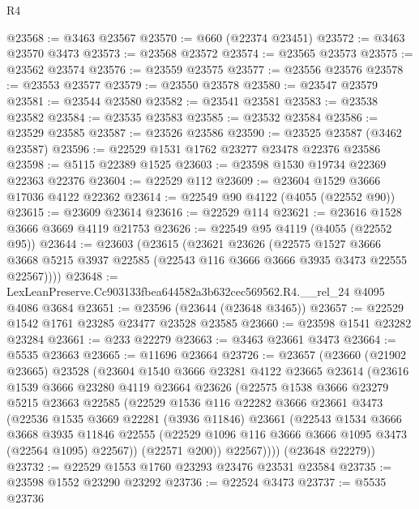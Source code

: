\begin{lexlean}{R4}
\begin{coremodule}
@23568 := @3463 @23567
@23570 := @660 (@22374 @23451)
@23572 := @3463 @23570 @3473
@23573 := @23568 @23572
@23574 := @23565 @23573
@23575 := @23562 @23574
@23576 := @23559 @23575
@23577 := @23556 @23576
@23578 := @23553 @23577
@23579 := @23550 @23578
@23580 := @23547 @23579
@23581 := @23544 @23580
@23582 := @23541 @23581
@23583 := @23538 @23582
@23584 := @23535 @23583
@23585 := @23532 @23584
@23586 := @23529 @23585
@23587 := @23526 @23586
@23590 := @23525 @23587 (@3462 @23587)
@23596 := @22529 @1531 @1762 @23277 @23478 @22376 @23586
@23598 := @5115 @22389 @1525
@23603 := @23598 @1530 @19734 @22369 @22363 @22376
@23604 := @22529 @112
@23609 := @23604 @1529 @3666 @17036 @4122 @22362
@23614 := @22549 @90 @4122 (@4055 (@22552 @90))
@23615 := @23609 @23614
@23616 := @22529 @114
@23621 := @23616 @1528 @3666 @3669 @4119 @21753
@23626 := @22549 @95 @4119 (@4055 (@22552 @95))
@23644 := @23603
    (@23615
      (@23621
        @23626
        (@22575
          @1527
          @3666
          @3668
          @5215
          @3937
          @22585
          (@22543 @116 @3666 @3666 @3935 @3473 @22555 @22567))))
@23648 := LexLeanPreserve.Cc903133fbea644582a3b632cec569562.R4.__rel_24 @4095 @4086 @3684
@23651 := @23596 (@23644 (@23648 @3465))
@23657 := @22529 @1542 @1761 @23285 @23477 @23528 @23585
@23660 := @23598 @1541 @23282 @23284
@23661 := @233 @22279
@23663 := @3463 @23661 @3473
@23664 := @5535 @23663
@23665 := @11696 @23664
@23726 := @23657
    (@23660
      (@21902 @23665)
      @23528
      (@23604
        @1540
        @3666
        @23281
        @4122
        @23665
        @23614
        (@23616
          @1539
          @3666
          @23280
          @4119
          @23664
          @23626
          (@22575
            @1538
            @3666
            @23279
            @5215
            @23663
            @22585
            (@22529
              @1536
              @116
              @22282
              @3666
              @23661
              @3473
              (@22536
                @1535
                @3669
                @22281
                (@3936 @11846)
                @23661
                (@22543
                  @1534
                  @3666
                  @3668
                  @3935
                  @11846
                  @22555
                  (@22529 @1096 @116 @3666 @3666 @1095 @3473 (@22564 @1095) @22567))
                (@22571 @200))
              @22567))))
      (@23648 @22279))
@23732 := @22529 @1553 @1760 @23293 @23476 @23531 @23584
@23735 := @23598 @1552 @23290 @23292
@23736 := @22524 @3473
@23737 := @5535 @23736

\end{coremodule}
\end{lexlean}
